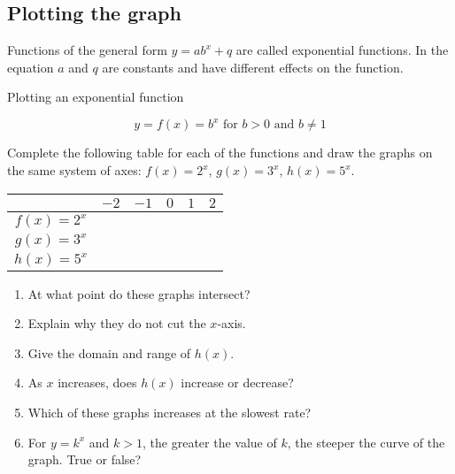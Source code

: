 \subsection*{Plotting the graph}         
Functions of the general form $y=ab^{x}+q$ are called exponential functions. In the equation $a$ and $q$ are constants and have different effects on the function.
\par
{}
\begin{wex}{Plotting an exponential function}
{
\begin{minipage}{\textwidth}


\begin{equation*}
  y=f(x)=b^{x} \mbox{ for } b>0 \mbox{ and } b \neq 1
\end{equation*}

Complete the following table for each of the functions and draw the graphs on the same system of axes:
$f(x)=2^{x}$, $g(x)=3^{x}$, $h(x)=5^{x}$.


\begin{table}[H]
\begin{center}
\begin{tabular}{|c|c|c|c|c|c|}
\hline
   &  $-2$ & $-1$ & $0$ & $1$ & $2$ 
\\ \hline
 $f(x)=2^{x}$& \hspace{1cm}   & \hspace{1cm} & \hspace{1cm} & \hspace{1cm} & \hspace{1cm} 
\\ \hline
 $g(x)=3^{x}$&  &&&&
\\ \hline
 $h(x)=5^{x}$&  &&&&
\\ \hline

\end{tabular}
\end{center}
\end{table}
\begin{enumerate}[noitemsep, label=\textbf{\arabic*}. ] 
 \item At what point do these graphs intersect?
\item Explain why they do not cut the $x$-axis.
\item Give the domain and range of $h(x)$.
 \item As $x$ increases, does $h(x)$ increase or decrease?
\item Which of these graphs increases at the slowest rate?
\item For $y=k^{x}$ and $k>1$, the greater the value of $k$, the steeper the curve of the graph. True or false?
\end{enumerate}


\end{minipage}}
\end{wex}
